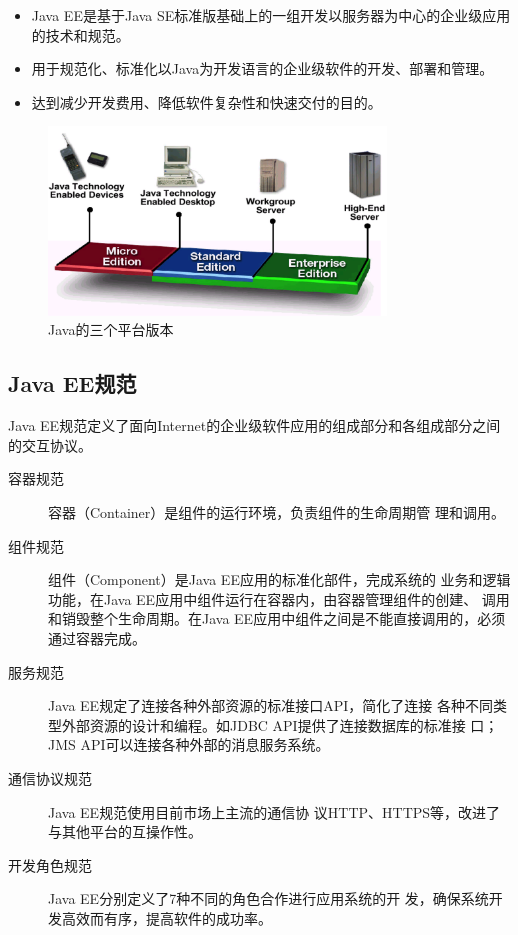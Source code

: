 \begin{itemize}
\item Java EE是基于Java SE标准版基础上的一组开发{\hei\Red 以服务器为中心的企业级应用}的技术和规范。
\item 用于规范化、标准化以Java为开发语言的企业级软件的开发、部署和管理。
\item 达到减少开发费用、降低软件复杂性和快速交付的目的。
\end{itemize}

\begin{figure}[htb]
\centering
\includegraphics[width=0.8\textwidth]{images/JavaEE-architecture/fig-javase-javame-javaee.png}
\caption{Java的三个平台版本}
\label{fig:javase-javame-javaee}
\end{figure}

\subsection{Java EE规范} 

Java EE规范定义了面向Internet的企业级软件应用的组成部分和各组成部分之间的交互协议。

\begin{description}
\item[容器规范] 容器（Container）是组件的运行环境，负责组件的生命周期管
  理和调用。
\item[组件规范] 组件（Component）是Java EE应用的标准化部件，完成系统的
  业务和逻辑功能，在Java EE应用中组件运行在容器内，由容器管理组件的创建、
  调用和销毁整个生命周期。在Java EE应用中组件之间是不能直接调用的，必须
  通过容器完成。
\item[服务规范] Java EE规定了连接各种外部资源的标准接口API，简化了连接
  各种不同类型外部资源的设计和编程。如JDBC API提供了连接数据库的标准接
  口；JMS API可以连接各种外部的消息服务系统。
\item[通信协议规范] Java EE规范使用目前市场上主流的通信协
  议HTTP、HTTPS等，改进了与其他平台的互操作性。
\item[开发角色规范] Java EE分别定义了7种不同的角色合作进行应用系统的开
  发，确保系统开发高效而有序，提高软件的成功率。
\end{description}

